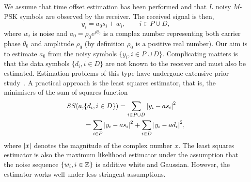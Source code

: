 \documentclass[journal]{IEEEtran}
\begin{document}
We assume that time offset estimation has been performed and that $L$ noisy $M$-PSK symbols are observed by the receiver.  The received signal is then,
\begin{equation}\label{eq:sigmod}
y_i = a_0 s_i + w_i, \qquad i \in P \cup D,
\end{equation}
where $w_i$ is noise and $a_0 = \rho_0 e^{j\theta_0}$ is a complex number representing both carrier phase $\theta_0$ and amplitude $\rho_0$ (by definition $\rho_0$ is a positive real number).  Our aim is to estimate $a_0$ from the noisy symbols $\{ y_i, i \in P \cup D \}$.  Complicating matters is that the data symbols $\{d_i, i \in D\}$ are not known to the receiver and must also be estimated.  Estimation problems of this type have undergone extensive prior study~\cite{ViterbiViterbi_phase_est_1983,Cowley_ref_sym_carr_1998,Wilson1989,Makrakis1990,Liu1991,Mackenthun1994,Sweldens2001,McKilliamLinearTimeBlockPSK2009,Divsalar1990}.  A practical approach is the least squares estimator, that is, the minimisers of the sum of squares function
\begin{equation}\label{eq:SSdefn}
\begin{split}
SS(a, &\{d_i, i \in D\}) = \sum_{i \in P \cup D} {\left\vert  y_i - a s_i  \right\vert}^2  \\
&= \sum_{i \in P} {\left\vert  y_i - a s_i  \right\vert}^2 + \sum_{i \in D} {\left\vert  y_i - a d_i  \right\vert}^2, 
\end{split}
\end{equation}
where ${\left\vert x \right\vert}$ denotes the magnitude of the complex number $x$.  The least squares estimator is also the maximum likelihood estimator under the assumption that the noise sequence $\{w_i, i \in {\mathbb Z}\}$ is additive white and Gaussian.  However, the estimator works well under less stringent assumptions.  %
\end{document}
